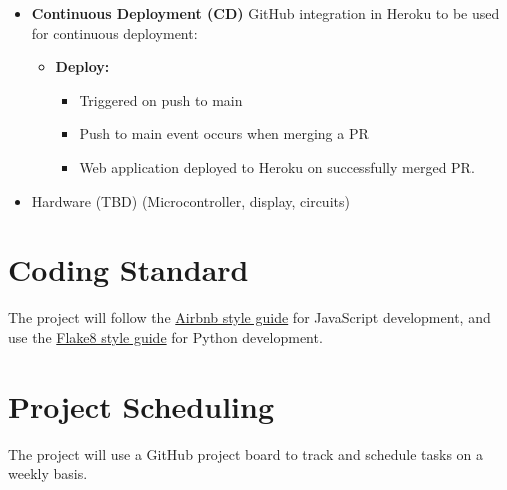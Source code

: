 \documentclass{article}
\begin{document}
\begin{itemize}
\begin{itemize}
\end{itemize}
\item \textbf{Continuous Deployment (CD)} GitHub integration in Heroku to be used for continuous deployment:
\begin{itemize}
    \item \textbf{Deploy:}
    \begin{itemize}
        \item Triggered on push to main
        \item Push to main event occurs when merging a PR
        \item Web application deployed to Heroku on successfully merged PR.
    \end{itemize}
\end{itemize}

\item Hardware (TBD) (Microcontroller, display, circuits)
\end{itemize}

\section{Coding Standard}
{The project will follow the \href{https://github.com/airbnb/javascript}{Airbnb style guide} for JavaScript development, and use the \href{https://flake8.pycqa.org/en/latest/}{Flake8 style guide} for Python development.}

\section{Project Scheduling}
{The project will use a GitHub project board to track and schedule tasks on a weekly basis.} 

\medskip
{}

\medskip
{}
\end{document}
